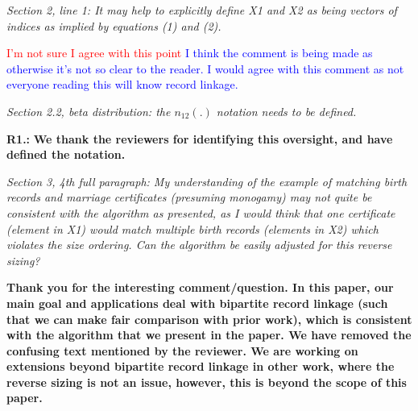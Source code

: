 \documentclass[letterpaper, parskip]{scrartcl}
\newcommand{\pointRaised}[1]{%
	\begin{tcolorbox}
		\itshape #1
	\end{tcolorbox}
}
\newcounter{responsectr}[section]     %
\newcommand{\reply}[2]{%
	\refstepcounter{responsectr}%
	\textbf{#1.\theresponsectr:} #2
}
\begin{document}
		\pointRaised{%
Section 2, line 1: It may help to explicitly define X1 and X2 as being vectors of indices as implied
by equations (1) and (2).
}
\textcolor{red}{I'm not sure I agree with this point}
\textcolor{blue}{I think the comment is being made as otherwise it's not so clear to the reader. I would agree with this comment as not everyone reading this will know record linkage.}

		\pointRaised{%
Section 2.2, beta distribution: the $n_{12}(.)$ notation needs to be defined.
}
		\reply{R1}{%
			\textbf{We thank the reviewers for identifying this oversight, and have defined the notation.}
		}

		\pointRaised{%
Section 3, 4th full paragraph: My understanding of the example of matching birth records and
marriage certificates (presuming monogamy) may not quite be consistent with the algorithm as
presented, as I would think that one certificate (element in X1) would match multiple birth
records (elements in X2) which violates the size ordering. Can the algorithm be easily adjusted
for this reverse sizing?
}

\textbf{Thank you for the interesting comment/question. In this paper, our main goal and applications deal with bipartite record linkage (such that we can make fair comparison with prior work), which is consistent with the algorithm that we present in the paper. We have removed the confusing text mentioned by the reviewer. We are working on extensions beyond bipartite record linkage in other work, where the reverse sizing is not an issue, however, this is beyond the scope of this paper.}

\end{document}

